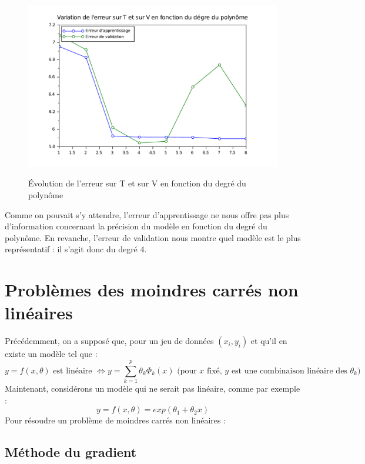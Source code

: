\documentclass[a4paper,10pt]{report}
\begin{document}
\begin{figure}[H]
\centering
\caption{Évolution de l'erreur sur T et sur V en fonction du degré du polynôme}
\includegraphics[width=12cm]{erreur_validation.pdf}
\label{erreur_validation}
\end{figure}

Comme on pouvait s'y attendre, l'erreur d'apprentissage ne nous offre pas plus d'information concernant la précision du modèle en fonction du degré du polynôme. En revanche, l'erreur de validation nous montre quel modèle est le plus représentatif : il s'agit donc du degré 4.


\section{Problèmes des moindres carrés non linéaires}
Précédemment, on a supposé que, pour un jeu de données $(x_i,y_i)$ et qu'il en existe un modèle tel que :
\abovedisplayskip=0mm
\begin{displaymath}
y=f(x,\theta) \text{ est linéaire } \Leftrightarrow y=\sum \limits^{p}_{k=1} \theta_k\Phi_k(x) \text{ (pour $x$ fixé, $y$ est une combinaison linéaire des $\theta_k$)}
\end{displaymath}
Maintenant, considérons un modèle qui ne serait pas linéaire, comme par exemple :
\abovedisplayskip=0mm
\begin{displaymath}
y=f(x,\theta) = exp(\theta_1 + \theta_2x)
\end{displaymath}
Pour résoudre un problème de moindres carrés non linéaires :

\subsection{Méthode du gradient}
\end{document}
